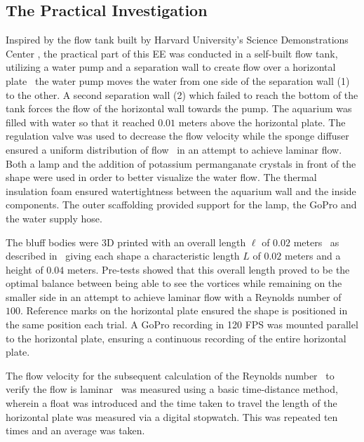 \subsection{The Practical Investigation}
\label{sec:practicalMethod}
Inspired by the flow tank built by Harvard University’s Science Demonstrations Center \parencite{noauthor_vortex_nodate}, the practical part of this EE was conducted in a self-built flow tank, utilizing a water pump and a separation wall to create flow over a horizontal plate \textemdash\ the water pump moves the water from one side of the separation wall (1) to the other. A second separation wall (2) which failed to reach the bottom of the tank forces the flow of the horizontal wall towards the pump. The aquarium was filled with water so that it reached $0.01$ meters above the horizontal plate. The regulation valve was used to decrease the flow velocity while the sponge diffuser ensured a uniform distribution of flow \textemdash\ in an attempt to achieve laminar flow. Both a lamp and the addition of potassium permanganate crystals in front of the shape were used in order to better visualize the water flow. The thermal insulation foam ensured watertightness between the aquarium wall and the inside components. The outer scaffolding provided support for the lamp, the GoPro and the water supply hose. 

The bluff bodies were 3D printed with an overall length $\ell$ of $0.02$ meters \textemdash\ as described in  \textemdash\ giving each shape a characteristic length $L$ of $0.02$ meters and a height of $0.04$ meters. Pre-tests showed that this overall length proved to be the optimal balance between being able to see the vortices while remaining on the smaller side in an attempt to achieve laminar flow with a Reynolds number of $100$. Reference marks on the horizontal plate ensured the shape is positioned in the same position each trial. A GoPro recording in 120 FPS was mounted parallel to the horizontal plate, ensuring a continuous recording of the entire horizontal plate. 

The flow velocity for the subsequent calculation of the Reynolds number \textemdash\ to verify the flow is laminar \textemdash\ was measured using a basic time-distance method, wherein a float was introduced and the time taken to travel the length of the horizontal plate was measured via a digital stopwatch. This was repeated ten times and an average was taken.

